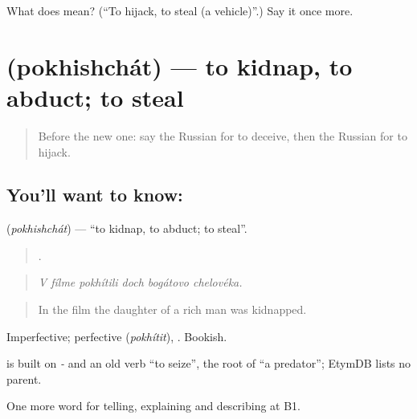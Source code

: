 \begin{tcolorbox}[breakable,colback=teal!4,colframe=teal!35!black,title={Before you move on}]
What does  mean? (\textquotedblleft{}To hijack, to steal (a vehicle)\textquotedblright{}.) Say it once more.
\end{tcolorbox}
\section[\texorpdfstring{\ru{похищать} (pokhishchát)}{похищать (pokhishchát)}]{ (pokhishchát) — to kidnap, to abduct; to steal}

\label{lesson:RU-C290-pokhishchat}



\begin{quote}
Before the new one: say the Russian for to deceive, then the Russian for to hijack.
\end{quote}

\subsection*{You'll want to know: }
\textbf{} (\emph{pokhishchát}) — \textquotedblleft{}to kidnap, to abduct; to steal\textquotedblright{}.

\begin{quote}
     .
\end{quote}

\begin{quote}
\emph{V fílme pokhítili doch bogátovo chelovéka.}
\end{quote}

\begin{quote}
In the film the daughter of a rich man was kidnapped.
\end{quote}

Imperfective; perfective \emph{} (\emph{pokhítit}), \emph{ }. Bookish.

\begin{cousinweb}
\emph{} is built on \emph{-} and an old verb \emph{} \textquotedblleft{}to seize\textquotedblright{}, the root of \emph{} \textquotedblleft{}a predator\textquotedblright{}; EtymDB lists no parent.
\end{cousinweb}

\begin{grammarlens}[title={What you've built}]
One more word for telling, explaining and describing at B1.
\end{grammarlens}

